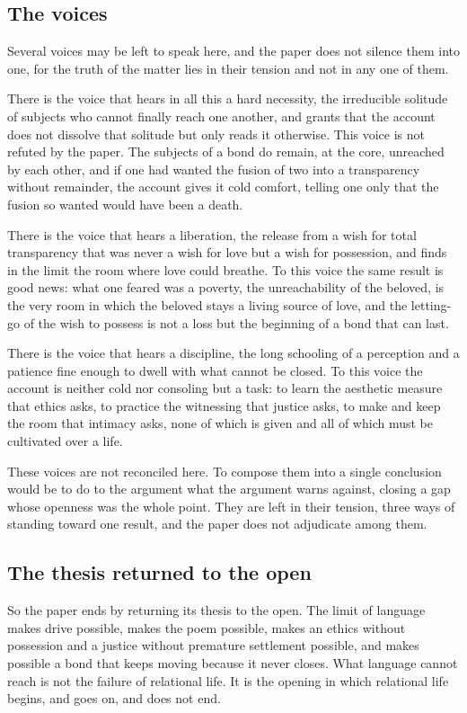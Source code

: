 \subsection*{The voices}

Several voices may be left to speak here, and the paper does not silence them into one, for the truth of the matter lies in their tension and not in any one of them.

There is the voice that hears in all this a hard necessity, the irreducible solitude of subjects who cannot finally reach one another, and grants that the account does not dissolve that solitude but only reads it otherwise. This voice is not refuted by the paper. The subjects of a bond do remain, at the core, unreached by each other, and if one had wanted the fusion of two into a transparency without remainder, the account gives it cold comfort, telling one only that the fusion so wanted would have been a death.

There is the voice that hears a liberation, the release from a wish for total transparency that was never a wish for love but a wish for possession, and finds in the limit the room where love could breathe. To this voice the same result is good news: what one feared was a poverty, the unreachability of the beloved, is the very room in which the beloved stays a living source of love, and the letting-go of the wish to possess is not a loss but the beginning of a bond that can last.

There is the voice that hears a discipline, the long schooling of a perception and a patience fine enough to dwell with what cannot be closed. To this voice the account is neither cold nor consoling but a task: to learn the aesthetic measure that ethics asks, to practice the witnessing that justice asks, to make and keep the room that intimacy asks, none of which is given and all of which must be cultivated over a life.

These voices are not reconciled here. To compose them into a single conclusion would be to do to the argument what the argument warns against, closing a gap whose openness was the whole point. They are left in their tension, three ways of standing toward one result, and the paper does not adjudicate among them.

\subsection*{The thesis returned to the open}

So the paper ends by returning its thesis to the open. The limit of language makes drive possible, makes the poem possible, makes an ethics without possession and a justice without premature settlement possible, and makes possible a bond that keeps moving because it never closes. What language cannot reach is not the failure of relational life. It is the opening in which relational life begins, and goes on, and does not end.
